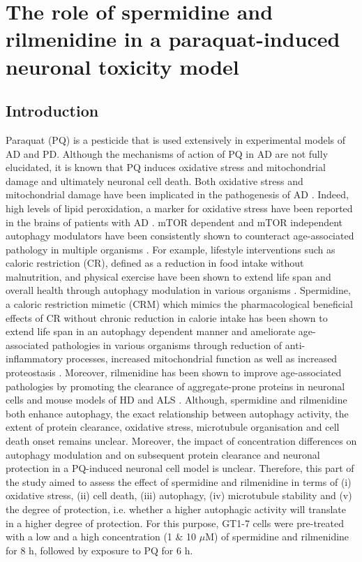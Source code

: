 \chapter{The role of spermidine and rilmenidine in a paraquat-induced neuronal toxicity model}
\label{sec:chapter4}
\section{Introduction}
Paraquat (PQ) is a pesticide that is used extensively in experimental models of AD and PD. Although the mechanisms of action of PQ in AD are not fully elucidated, it is known that PQ induces oxidative stress and mitochondrial damage \citep{Chen2012} and ultimately neuronal cell death. Both oxidative stress and mitochondrial damage have been implicated in the pathogenesis of AD \citep{Chen2012,Lin2006}. Indeed, high levels of lipid peroxidation, a marker for oxidative stress have been reported in the brains of patients with AD \citep{Wang2014,Zhao2013}. mTOR dependent and mTOR independent autophagy modulators have been consistently shown to counteract age-associated pathology in multiple organisms \citep{lumkwana2017}. For example, lifestyle interventions such as caloric restriction (CR), defined as a reduction in food intake without malnutrition,  and physical exercise have been shown to extend life span and overall health through autophagy modulation in various organisms \citep{Law2018,Frederiksen2017,Liu2019,Lin2017}. Spermidine, a caloric restriction mimetic (CRM) which mimics the pharmacological beneficial effects of CR without chronic reduction in calorie intake has been shown to extend life span in an autophagy dependent manner and ameliorate age-associated pathologies in various organisms \citep{Buttner2014,Eisenberg2016a,Gupta2016,Morselli2011,Morselli2009,Sigrist2014,Yue2017,Zhang2017} through reduction of anti-inflammatory processes, increased mitochondrial function as well as increased proteostasis \citep{Madeo2018}. Moreover, rilmenidine has been shown to improve age-associated pathologies by promoting the clearance of aggregate-prone proteins in neuronal cells and mouse models of HD and ALS \citep{Perera2018,Rose2010}. Although, spermidine and rilmenidine both enhance autophagy, the exact relationship between autophagy activity, the extent of protein clearance, oxidative stress, microtubule organisation and cell death onset remains unclear. Moreover, the impact of concentration differences on autophagy modulation and on subsequent protein clearance and neuronal protection in a PQ-induced neuronal cell model is unclear. Therefore, this part of the study aimed to assess the effect of spermidine and rilmenidine in terms of (i) oxidative stress, (ii) cell death, (iii) autophagy, (iv) microtubule stability and (v) the degree of protection, i.e. whether a higher autophagic activity will translate in a higher degree of protection. For this purpose, GT1-7 cells were pre-treated with a low and a high concentration (1 \& 10 $\mu$M) of spermidine and rilmenidine for 8 h, followed by exposure to PQ for 6 h.

